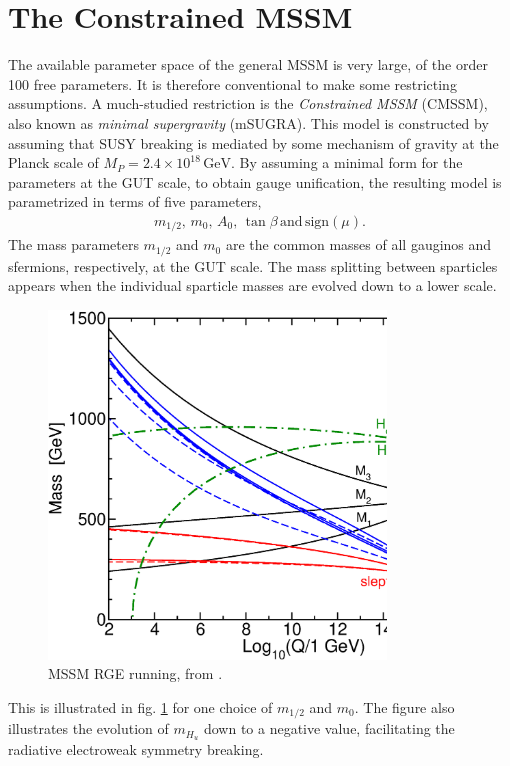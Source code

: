 \section{The Constrained MSSM}
The available parameter space of the general MSSM is very large, of the order 100 free parameters. It is therefore conventional to make some restricting assumptions. A much-studied restriction is the {\it Constrained MSSM} (CMSSM), also known as {\it minimal supergravity} (mSUGRA). This model is constructed by assuming that SUSY breaking is mediated by some mechanism of gravity at the Planck scale of $M_P = 2.4\times 10^{18} \, \mathrm{GeV}$. By assuming a minimal form for the parameters at the GUT scale, to obtain gauge unification, the resulting model is parametrized in terms of five parameters,
\begin{align}
	m_{1/2}, \, m_{0}, \, A_0, \, \tan\beta \, \mathrm{and} \, \mathrm{sign}(\mu).
\end{align}
The mass parameters $m_{1/2}$ and $m_0$ are the common masses of all gauginos and sfermions, respectively, at the GUT scale. The mass splitting between sparticles appears when the individual sparticle masses are evolved down to a lower scale.
\begin{figure}[hbt]
	\centering
	\includegraphics[width=0.8\textwidth]{figures/susyintro/MSSMrun.eps}
	\caption{MSSM RGE running, from \cite{Martin:1997ns}.}
	\label{fig:mssm_rgerun}
\end{figure}
This is illustrated in fig. \ref{fig:mssm_rgerun} for one choice of $m_{1/2}$ and $m_0$. The figure also illustrates the evolution of $m_{H_u}$ down to a negative value, facilitating the radiative electroweak symmetry breaking.

